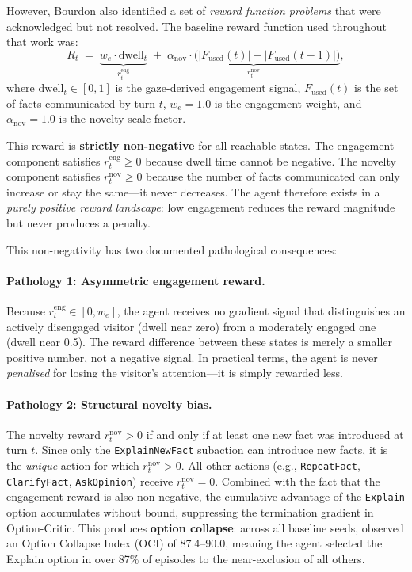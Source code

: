 \documentclass[12pt,a4paper]{article}
\newcommand{\reng}{r^{\mathrm{eng}}_t}
\newcommand{\rnov}{r^{\mathrm{nov}}_t}
\newcommand{\Fused}{F_{\mathrm{used}}}
\begin{document}
However, Bourdon also identified a set of \emph{reward function problems} that were acknowledged but not resolved. The baseline reward function used throughout that work was:
\begin{equation}
\label{eq:baseline}
R_t \;=\; \underbrace{w_e \cdot \mathrm{dwell}_t}_{\reng} \;+\; \underbrace{\alpha_{\mathrm{nov}} \cdot \bigl(|\Fused(t)| - |\Fused(t-1)|\bigr)}_{\rnov},
\end{equation}
where $\mathrm{dwell}_t \in [0,1]$ is the gaze-derived engagement signal, $\Fused(t)$ is the set of facts communicated by turn $t$, $w_e = 1.0$ is the engagement weight, and $\alpha_{\mathrm{nov}} = 1.0$ is the novelty scale factor.

This reward is \textbf{strictly non-negative} for all reachable states. The engagement component satisfies $\reng \geq 0$ because dwell time cannot be negative. The novelty component satisfies $\rnov \geq 0$ because the number of facts communicated can only increase or stay the same---it never decreases. The agent therefore exists in a \emph{purely positive reward landscape}: low engagement reduces the reward magnitude but never produces a penalty.

This non-negativity has two documented pathological consequences:

\paragraph{Pathology 1: Asymmetric engagement reward.}
Because $\reng \in [0, w_e]$, the agent receives no gradient signal that distinguishes an actively disengaged visitor (dwell near zero) from a moderately engaged one (dwell near 0.5). The reward difference between these states is merely a smaller positive number, not a negative signal. In practical terms, the agent is never \emph{penalised} for losing the visitor's attention---it is simply rewarded less.

\paragraph{Pathology 2: Structural novelty bias.}
The novelty reward $\rnov > 0$ if and only if at least one new fact was introduced at turn $t$. Since only the \texttt{ExplainNewFact} subaction can introduce new facts, it is the \emph{unique} action for which $\rnov > 0$. All other actions (e.g., \texttt{RepeatFact}, \texttt{ClarifyFact}, \texttt{AskOpinion}) receive $\rnov = 0$. Combined with the fact that the engagement reward is also non-negative, the cumulative advantage of the \texttt{Explain} option accumulates without bound, suppressing the termination gradient in Option-Critic. This produces \textbf{option collapse}: across all baseline seeds, \citet{bourdon2025} observed an Option Collapse Index (OCI) of 87.4--90.0, meaning the agent selected the Explain option in over 87\% of episodes to the near-exclusion of all others.
\end{document}

